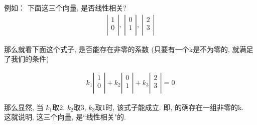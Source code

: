 \documentclass[UTF8]{ctexart}
\begin{document}
\begin{myEnvSample}
	例如： 下面这三个向量, 是否线性相关?
	\begin{align}
		\left| \begin{array}{l}
			       1 \\
			       0 \\
		       \end{array} \right|,\ \left| \begin{array}{l}
			                                    0 \\
			                                    1 \\
		                                    \end{array} \right|,\ \left| \begin{array}{l}
			                                                                 2 \\
			                                                                 3 \\
		                                                                 \end{array} \right|
	\end{align}

	那么就看下面这个式子, 是否能存在非零的系数 (只要有一个k是不为零的, 就满足了我们的条件)

	\begin{align}
		k_1\left| \begin{array}{l}
			          1 \\
			          0 \\
		          \end{array} \right|+k_2\left| \begin{array}{l}
			                                        0 \\
			                                        1 \\
		                                        \end{array} \right|+k_3\left| \begin{array}{l}
			                                                                      2 \\
			                                                                      3 \\
		                                                                      \end{array} \right|=0
	\end{align}

	那么显然, 当 $ k_1$取2, $k_2$取3, $k_3$取1时, 该式子能成立. 即, 的确存在一组非零的k. \\
	这就说明, 这三个向量, 是``线性相关"的.
\end{myEnvSample}
\end{document}
